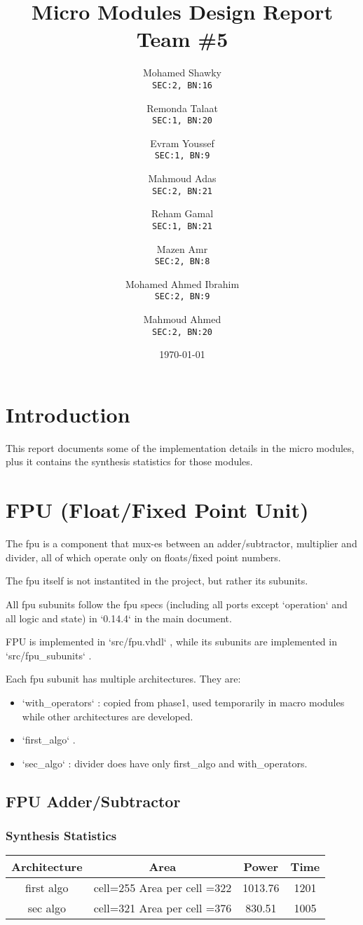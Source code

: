 \documentclass[12pt]{report}
\title{\textbf{Micro Modules Design Report}\\Team \#5}
\author{
  Mohamed Shawky\\
  \small\texttt{SEC:2, BN:16}
  \and
  Remonda Talaat\\
  \small\texttt{SEC:1, BN:20}
  \and
  Evram Youssef\\
  \small\texttt{SEC:1, BN:9}
  \and
  Mahmoud Adas\\
  \small\texttt{SEC:2, BN:21}
  \and
  Reham Gamal\\
  \small\texttt{SEC:1, BN:21}
  \and
  Mazen Amr\\
  \small\texttt{SEC:2, BN:8}
  \and
  Mohamed Ahmed Ibrahim\\
  \small\texttt{SEC:2, BN:9}
  \and
  Mahmoud Ahmed\\
  \small\texttt{SEC:2, BN:20}
}
\date{\today}
\begin{document}
    \thispagestyle{empty}

    \maketitle
    \tableofcontents
    \clearpage


    \section{Introduction}
    This report documents some of the implementation details in the micro modules, plus it contains the synthesis statistics for those modules. 

    \section{FPU (Float/Fixed Point Unit)}
    The fpu is a component that mux-es between an adder/subtractor, multiplier and divider, all of which operate only on floats/fixed point numbers. 

    The fpu itself is not instantited in the project, but rather its subunits. 

    All fpu subunits follow the fpu specs (including all ports except `operation` and all logic and state) in `0.14.4` in the main document. 

    FPU is implemented in `src/fpu.vhdl` , while its subunits are implemented in `src/fpu\_subunits` . 

    Each fpu subunit has multiple architectures. 
    They are: 
    \begin{itemize}
      \item `with\_operators` : copied from phase1, used temporarily in macro modules while other architectures are developed. 
    \item `first\_algo` . 
    \item `sec\_algo` : divider does have only first\_algo and with\_operators. 
    \end{itemize}

    \subsection{FPU Adder/Subtractor}
    \subsubsection{Synthesis Statistics}
    \begin{tabular}{||c|c|c|c||}
      \hline
      Architecture & Area & Power & Time\\\hline\hline
      first algo & cell=255 Area per cell =322 & 1013.76 & 1201\\
      sec algo & cell=321 Area per cell =376 & 830.51 & 1005 \\\hline
  \end{tabular}
\end{document}
